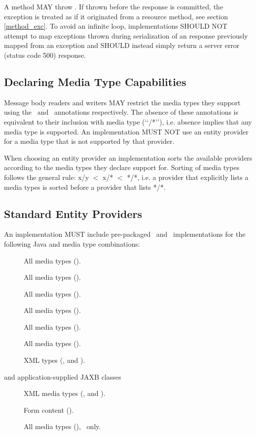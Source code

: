 A \MsgWrite{} method MAY throw \WebAppExc. If thrown before the response is committed, the exception is treated as if it originated from a resource method, see section \ref{method_exc}. To avoid an infinite loop, implementations SHOULD NOT attempt to map exceptions thrown during serialization of an response previously mapped from an exception and SHOULD instead simply return a server error (status code 500) response.

\subsection{Declaring Media Type Capabilities}
\label{declaring_provider_capabilities}

Message body readers and writers MAY restrict the media types they support using the \Consumes\ and \Produces\ annotations respectively. The absence of these annotations is equivalent to their inclusion with media type (\lq\lq*/*\rq\rq), i.e. absence implies that any media type is supported. An implementation MUST NOT use an entity provider for a media type that is not supported by that provider.

When choosing an entity provider an implementation sorts the available providers according to the media types they declare support for. Sorting of media types follows the general rule: x/y $<$ x/* $<$ */*, i.e. a provider that explicitly lists a media types is sorted before a provider that lists */*.

\subsection{Standard Entity Providers}
\label{standard_entity_providers}

An implementation MUST include pre-packaged \MsgRead\ and \MsgWrite\ implementations for the following Java and media type combinations:

\begin{description}
\item[] All media types (\code{*/*}).
\item[] All media types (\code{*/*}).
\item[] All media types (\code{*/*}).
\item[] All media types (\code{*/*}).
\item[] All media types (\code{*/*}).
\item[] All media types (\code{*/*}).
\item[] XML types (,  and ).
\item[ and application-supplied JAXB classes] XML media types (,  and ).
\item[] Form content ().
\item[] All media types (\code{*/*}), \MsgWrite\ only.
\end{description}

